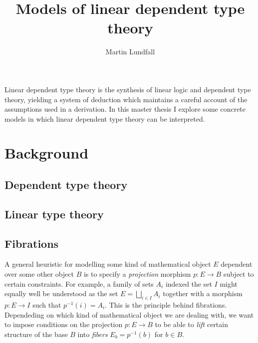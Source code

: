 
\usepackage[margin=0.5in]{geometry}

\title{Models of linear dependent type theory}
\author{Martin Lundfall}
\maketitle
\abstract
Linear dependent type theory is the synthesis of linear logic and dependent type theory, yielding a system of deduction which maintains a careful account of the assumptions used in a derivation. In this master thesis I explore some concrete models in which linear dependent type theory can be interpreted.
\newpage
\tableofcontents
\newpage
\section{Background}

\subsection{Dependent type theory}

\subsection{Linear type theory}
\subsection{Fibrations}

A general heuristic for modelling some kind of mathematical object $E$ dependent over some other object $B$ is to specify a \textit{projection} morphism $p : E \to B$ subject to certain constraints. For example, a family of sets $A_i$ indexed the set $I$ might equally well be understood as the set $E = \bigsqcup_{i \in I}A_i$ together with a morphism $p : E  \to I$ such that $p^{-1}(i) = A_i$. This is the principle behind fibrations. Dependeding on which kind of mathematical object we are dealing with, we want to impose conditions on the projection $p : E \to B$ to be able to \textit{lift} certain structure of the base $B$ into \textit{fibers} $E_b = p^{-1}(b)$ for $b \in B$.

